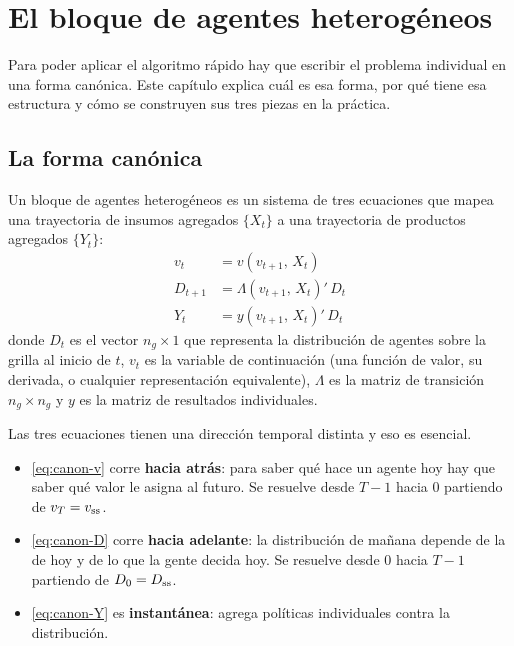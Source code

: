 \chapter{El bloque de agentes heterogéneos}
\label{cap:bloque}

Para poder aplicar el algoritmo rápido hay que escribir el problema individual
en una forma canónica. Este capítulo explica cuál es esa forma, por qué tiene
esa estructura y cómo se construyen sus tres piezas en la práctica.

\section{La forma canónica}

\begin{definicion}
Un bloque de agentes heterogéneos es un sistema de tres ecuaciones que mapea
una trayectoria de insumos agregados $\{X_t\}$ a una trayectoria de productos
agregados $\{Y_t\}$:
\begin{align}
v_t &= v(v_{t+1},\, X_t) \label{eq:canon-v}\\
D_{t+1} &= \Lambda(v_{t+1},\, X_t)'\, D_t \label{eq:canon-D}\\
Y_t &= y(v_{t+1},\, X_t)'\, D_t \label{eq:canon-Y}
\end{align}
donde $D_t$ es el vector $n_g\times 1$ que representa la distribución de agentes
sobre la grilla al inicio de $t$, $v_t$ es la variable de continuación (una
función de valor, su derivada, o cualquier representación equivalente),
$\Lambda$ es la matriz de transición $n_g\times n_g$ y $y$ es la matriz de
resultados individuales.
\end{definicion}

Las tres ecuaciones tienen una dirección temporal distinta y eso es esencial.

\begin{itemize}[leftmargin=1.4em]
\item \eqref{eq:canon-v} corre \textbf{hacia atrás}: para saber qué hace un
agente hoy hay que saber qué valor le asigna al futuro. Se resuelve desde
$T-1$ hacia $0$ partiendo de $v_T = v_{\mathrm{ss}}$.
\item \eqref{eq:canon-D} corre \textbf{hacia adelante}: la distribución de
mañana depende de la de hoy y de lo que la gente decida hoy. Se resuelve desde
$0$ hacia $T-1$ partiendo de $D_0 = D_{\mathrm{ss}}$.
\item \eqref{eq:canon-Y} es \textbf{instantánea}: agrega políticas individuales
contra la distribución.
\end{itemize}

